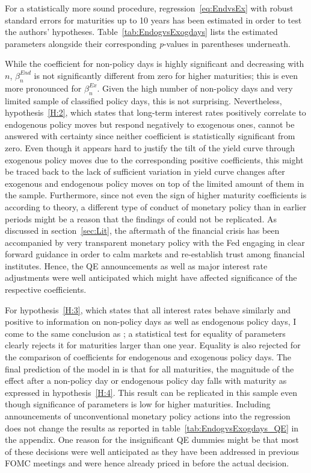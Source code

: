 For a statistically more sound procedure, regression~\eqref{eq:EndvsEx} with robust standard errors for maturities up to 10 years has been estimated in order to test the authors' hypotheses. Table~\vref{tab:EndogvsExogdays} lists the estimated parameters alongside their corresponding \textit{p}-values in parentheses underneath.

%
While the coefficient for non-policy days is highly significant and decreasing with $n$, $\beta_n^{End}$ is not significantly different from zero for higher maturities; this is even more pronounced for $\beta_n^{Ex}$. Given the high number of non-policy days and very limited sample of classified policy days, this is not surprising. Nevertheless, hypothesis~\ref{H:2}, which states that long-term interest rates positively correlate to endogenous policy moves but respond negatively to exogenous ones, cannot be answered with certainty since neither coefficient is statistically significant from zero. Even though it appears hard to justify the tilt of the yield curve through exogenous policy moves due to the corresponding positive coefficients, this might be traced back to the lack of sufficient variation in yield curve changes after exogenous and endogenous policy moves on top of the limited amount of them in the sample. Furthermore, since not even the sign of higher maturity coefficients is according to theory, a different type of conduct of monetary policy than in earlier periods might be a reason that the findings of \textcite{Ellingsen.2003} could not be replicated. As discussed in section~\ref{sec:Lit}, the aftermath of the financial crisis has been accompanied by very transparent monetary policy with the Fed engaging in clear forward guidance in order to calm markets and re-establish trust among financial institutes. Hence, the QE announcements as well as major interest rate adjustments were well anticipated which might have affected significance of the respective coefficients.

For hypothesis~\ref{H:3}, which states that all interest rates behave similarly and positive to information on non-policy days as well as endogenous policy days, I come to the same conclusion as \textcite{Ellingsen.2003}; a statistical test for equality of parameters clearly rejects it for maturities larger than one year. Equality is also rejected for the comparison of coefficients for endogenous and exogenous policy days. The final prediction of the model in \textcite{Ellingsen.2001} is that for all maturities, the magnitude of the effect after a non-policy day or endogenous policy day falls with maturity as expressed in hypothesis~\ref{H:4}. This result can be replicated in this sample even though significance of parameters is low for higher maturities. 
Including announcements of unconventional monetary policy actions into the regression does not change the results as reported in table~\vref{tab:EndogvsExogdays_QE} in the appendix. One reason for the insignificant QE dummies might be that most of these decisions were well anticipated as they have been addressed in previous FOMC meetings and were hence already priced in before the actual decision. 

